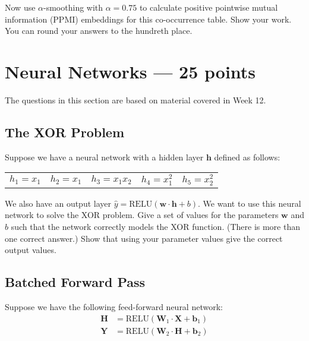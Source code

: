 \documentclass[12pt,a4paper]{article}
\begin{document}
Now use $\alpha$-smoothing with $\alpha=0.75$ to calculate positive pointwise mutual information (PPMI) embeddings for this co-occurrence table. Show your work. You can round your answers to the hundreth place.

\section{Neural Networks --- 25 points}

The questions in this section are based on material covered in Week 12.

\subsection{The XOR Problem}

Suppose we have a neural network with a hidden layer $\mathbf{h}$ defined as follows:
\begin{center}
\begin{tabular}{l l l l l}
$h_1 = x_1$ & $h_2 = x_1$ & $h_3 = x_1 x_2$ & $h_4 = x_1^2$ & $h_5 = x_2^2$ \\
\end{tabular}
\end{center}

We also have an output layer $\hat{y} = \text{RELU}(\mathbf{w} \cdot \mathbf{h} + b)$. We want to use this neural network to solve the XOR problem. Give a set of values for the parameters $\mathbf{w}$ and $b$ such that the network correctly models the XOR function. (There is more than one correct answer.) Show that using your parameter values give the correct output values.

\pagebreak

\subsection{Batched Forward Pass}

Suppose we have the following feed-forward neural network:
\begin{align*}
\mathbf{H} &= \text{RELU}(\mathbf{W}_1 \cdot \mathbf{X} + \mathbf{b}_1) \\
\mathbf{Y} &= \text{RELU}(\mathbf{W}_2 \cdot \mathbf{H} + \mathbf{b}_2) \\
\end{align*}
\end{document}
